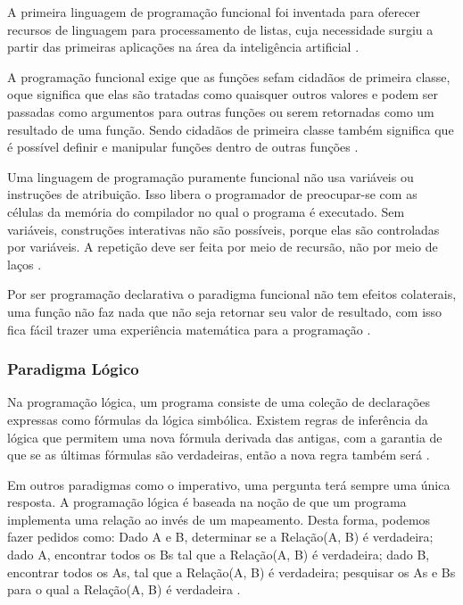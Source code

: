 A primeira linguagem de programação funcional foi inventada para oferecer recursos de linguagem para processamento de listas, cuja necessidade surgiu a partir das primeiras aplicações na área da inteligência artificial \cite[pág.~361]{tucker2009}.

A programação funcional exige que as funções sefam cidadãos de primeira classe, oque significa que elas são tratadas como quaisquer outros valores e podem ser passadas como argumentos para outras funções ou serem retornadas como um resultado de uma função. Sendo cidadãos de primeira classe também significa que é possível definir e manipular funções dentro de outras funções \cite{hoogle2013}.
	
Uma linguagem de programação puramente funcional não usa variáveis ou instruções de atribuição. Isso libera o programador de preocupar-se com as células da memória do compilador no qual o programa é executado. Sem variáveis, construções interativas não são possíveis, porque elas são controladas por variáveis. A repetição deve ser feita por meio de recursão, não por meio de laços \cite[pág.~555]{sebesta2012}.

Por ser programação declarativa o paradigma funcional não tem efeitos colaterais, uma função não faz nada que não seja retornar seu valor de resultado, com isso fica fácil trazer uma experiência matemática para a programação \cite{piponi2006}.

\subsubsection{Paradigma Lógico}

Na programação lógica, um programa consiste de uma coleção de declarações expressas como fórmulas da lógica simbólica. Existem regras de inferência da lógica que permitem uma nova fórmula derivada das antigas, com a garantia de que se as últimas fórmulas são verdadeiras, então a nova regra também será \cite[pág.~2]{spivey1996}. 

Em outros paradigmas como o imperativo, uma pergunta terá sempre uma única resposta. A programação lógica é baseada na noção de que um programa implementa uma relação ao invés de um mapeamento. Desta forma, podemos fazer pedidos como: Dado A e B, determinar se a Relação(A, B) é verdadeira; dado A, encontrar todos os Bs tal que a Relação(A, B) é verdadeira; dado B, encontrar todos os As, tal que a Relação(A, B) é verdadeira; pesquisar os As e Bs para o qual a Relação(A, B) é verdadeira \cite[pág.~33]{paquet2010}.

